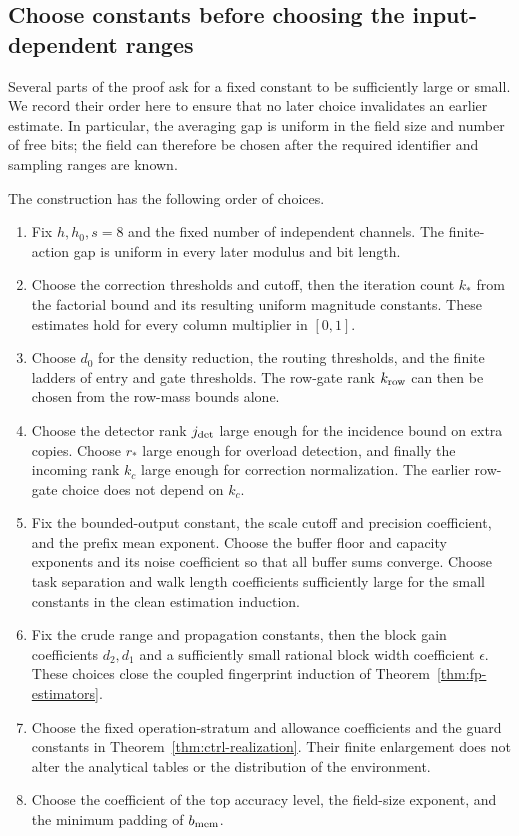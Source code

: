 \documentclass[11pt]{article}
\numberwithin{equation}{section}
\theoremstyle{definition}
\theoremstyle{remark}
\begin{document}
\subsection{Choose constants before choosing the input-dependent ranges}
\label{subsec:final-constants}

Several parts of the proof ask for a fixed constant to be sufficiently large or small. We record their order here to ensure that no later choice invalidates an earlier estimate. In particular, the averaging gap is uniform in the field size and number of free bits; the field can therefore be chosen after the required identifier and sampling ranges are known.

The construction has the following order of choices.
\begin{enumerate}
\item Fix ${h},h_0,s=8$ and the fixed number of independent channels.
The finite-action gap is uniform in every later modulus and bit length.
\item Choose the correction thresholds and cutoff, then the iteration
count $k_*$ from the factorial bound and its resulting uniform
magnitude constants. These estimates hold for every column multiplier
in $[0,1]$.
\item Choose ${d}_0$ for the density reduction, the routing thresholds,
and the finite ladders of entry and gate thresholds. The row-gate
rank ${k_{\rm row}}$ can then be chosen from the row-mass bounds alone.
\item Choose the detector rank ${j_{\rm det}}$ large enough for the incidence
bound on extra copies. Choose ${r}_*$ large enough for overload
detection, and finally the incoming rank ${k}_c$ large enough for
correction normalization. The earlier row-gate choice does not depend
on ${k}_c$.
\item Fix the bounded-output constant, the scale cutoff and precision
coefficient, and the prefix mean exponent. Choose the buffer
floor and capacity exponents and its noise coefficient so that all
buffer sums converge. Choose task separation and walk length
coefficients sufficiently large for the small constants in the
clean estimation induction.
\item Fix the crude range and propagation constants, then the block
gain coefficients ${d}_2,{d}_1$ and a sufficiently small rational block
width coefficient $\epsilon$. These choices close the coupled
fingerprint induction of Theorem~\ref{thm:fp-estimators}.
\item Choose the fixed operation-stratum and allowance coefficients
and the guard constants in Theorem~\ref{thm:ctrl-realization}.
Their finite enlargement does not alter the analytical tables or
the distribution of the environment.
\item Choose the coefficient of the top accuracy level, the field-size
exponent, and the minimum padding of ${b_{\rm mem}}$.
\end{enumerate}
\end{document}
